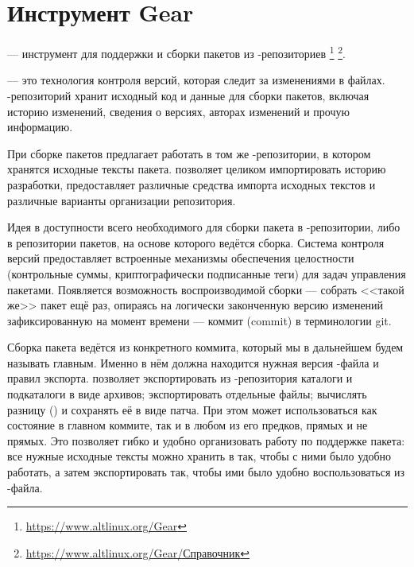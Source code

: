 \chapter{Инструмент Gear}\label{chapter-gear}
 --- 
инструмент для поддержки и сборки пакетов из -репозиториев%
\footnote{\href{https://www.altlinux.org/Gear}{https://www.altlinux.org/Gear}}%
\footnote{\href{https://www.altlinux.org/Gear/\%D0\%A1\%D0\%BF\%D1\%80\%D0\%B0\%D0\%B2\%D0\%BE\%D1\%87\%D0\%BD\%D0\%B8\%D0\%BA}{https://www.altlinux.org/Gear/Справочник}}.


 --- это технология контроля версий, которая следит за изменениями в файлах. 
-репозиторий хранит исходный код и данные для сборки пакетов, включая историю 
изменений, сведения о версиях, авторах изменений и прочую информацию. 

При сборке пакетов  предлагает работать в том же -репозитории, 
в котором хранятся исходные тексты пакета.  позволяет целиком импортировать 
историю разработки, предоставляет различные средства импорта исходных текстов и 
различные варианты организации репозитория. 

Идея  в доступности всего необходимого для сборки пакета в -репозитории, 
либо в репозитории пакетов, на основе которого ведётся сборка. Система контроля версий 
 предоставляет встроенные механизмы обеспечения целостности (контрольные суммы, 
криптографически подписанные теги) для задач управления пакетами. Появляется возможность 
воспроизводимой сборки --- собрать <<такой же>> пакет ещё раз, опираясь на логически 
законченную версию изменений зафиксированную на момент времени --- коммит (commit) в 
терминологии git.

Сборка пакета ведётся из конкретного коммита, который мы в дальнейшем будем называть главным. 
Именно в нём должна находится нужная версия -файла и правил экспорта.  
позволяет экспортировать из -репозитория каталоги и подкаталоги в виде архивов; 
экспортировать отдельные файлы; вычислять разницу () и сохранять её в виде патча. 
При этом может использоваться как состояние в главном коммите, так и в любом из его предков, 
прямых и не прямых. Это позволяет гибко и удобно организовать работу по поддержке пакета: 
все нужные исходные тексты можно хранить в  так, чтобы с ними было удобно работать, 
а затем экспортировать так, чтобы ими было удобно воспользоваться из -файла.


